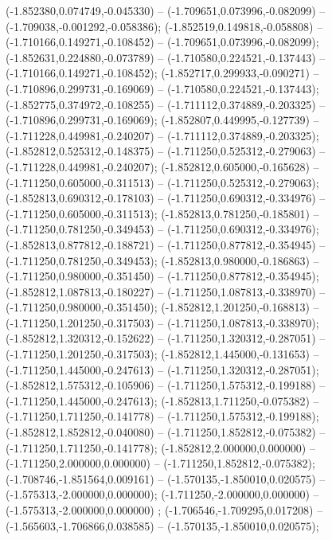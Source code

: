  (-1.852380,0.074749,-0.045330) -- (-1.709651,0.073996,-0.082099) -- (-1.709038,-0.001292,-0.058386);
 (-1.852519,0.149818,-0.058808) -- (-1.710166,0.149271,-0.108452) -- (-1.709651,0.073996,-0.082099);
 (-1.852631,0.224880,-0.073789) -- (-1.710580,0.224521,-0.137443) -- (-1.710166,0.149271,-0.108452);
 (-1.852717,0.299933,-0.090271) -- (-1.710896,0.299731,-0.169069) -- (-1.710580,0.224521,-0.137443);
 (-1.852775,0.374972,-0.108255) -- (-1.711112,0.374889,-0.203325) -- (-1.710896,0.299731,-0.169069);
 (-1.852807,0.449995,-0.127739) -- (-1.711228,0.449981,-0.240207) -- (-1.711112,0.374889,-0.203325);
 (-1.852812,0.525312,-0.148375) -- (-1.711250,0.525312,-0.279063) -- (-1.711228,0.449981,-0.240207);
 (-1.852812,0.605000,-0.165628) -- (-1.711250,0.605000,-0.311513) -- (-1.711250,0.525312,-0.279063);
 (-1.852813,0.690312,-0.178103) -- (-1.711250,0.690312,-0.334976) -- (-1.711250,0.605000,-0.311513);
 (-1.852813,0.781250,-0.185801) -- (-1.711250,0.781250,-0.349453) -- (-1.711250,0.690312,-0.334976);
 (-1.852813,0.877812,-0.188721) -- (-1.711250,0.877812,-0.354945) -- (-1.711250,0.781250,-0.349453);
 (-1.852813,0.980000,-0.186863) -- (-1.711250,0.980000,-0.351450) -- (-1.711250,0.877812,-0.354945);
 (-1.852812,1.087813,-0.180227) -- (-1.711250,1.087813,-0.338970) -- (-1.711250,0.980000,-0.351450);
 (-1.852812,1.201250,-0.168813) -- (-1.711250,1.201250,-0.317503) -- (-1.711250,1.087813,-0.338970);
 (-1.852812,1.320312,-0.152622) -- (-1.711250,1.320312,-0.287051) -- (-1.711250,1.201250,-0.317503);
 (-1.852812,1.445000,-0.131653) -- (-1.711250,1.445000,-0.247613) -- (-1.711250,1.320312,-0.287051);
 (-1.852812,1.575312,-0.105906) -- (-1.711250,1.575312,-0.199188) -- (-1.711250,1.445000,-0.247613);
 (-1.852813,1.711250,-0.075382) -- (-1.711250,1.711250,-0.141778) -- (-1.711250,1.575312,-0.199188);
 (-1.852812,1.852812,-0.040080) -- (-1.711250,1.852812,-0.075382) -- (-1.711250,1.711250,-0.141778);
 (-1.852812,2.000000,0.000000) -- (-1.711250,2.000000,0.000000) -- (-1.711250,1.852812,-0.075382);
 (-1.708746,-1.851564,0.009161) -- (-1.570135,-1.850010,0.020575) -- (-1.575313,-2.000000,0.000000);
 (-1.711250,-2.000000,0.000000) -- (-1.575313,-2.000000,0.000000) ;
 (-1.706546,-1.709295,0.017208) -- (-1.565603,-1.706866,0.038585) -- (-1.570135,-1.850010,0.020575);

